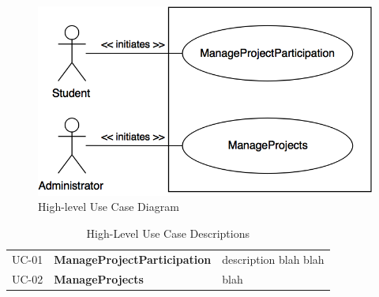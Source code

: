 \documentclass[12pt,letterpaper]{article}
\begin{document}
\begin{figure}[H]
	\centering{}
	\includegraphics[scale=0.4]{imgs/high-level-use-case.png}
	\caption{High-level Use Case Diagram}
\end{figure}

\begin{table}[H]
\caption{High-Level Use Case Descriptions}
\renewcommand{\arraystretch}{1.5}
\everyrow{\hline}
\begin{tabu} to 
UC-01 & ManageProjectParticipation & description blah blah \\
UC-02 & ManageProjects & blah \\
\end{tabu}
\end{table}
\end{document}
